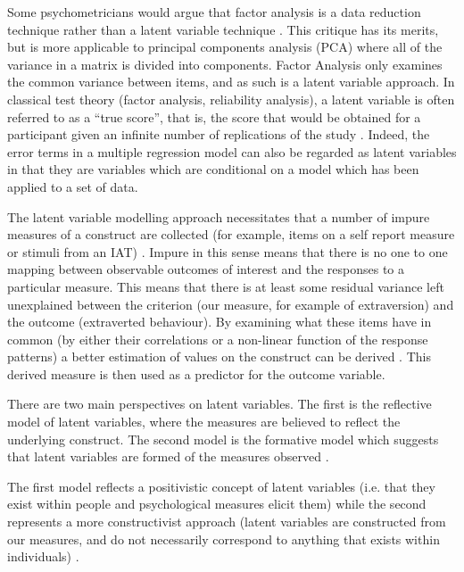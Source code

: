 Some psychometricians would argue that factor analysis is a data reduction technique rather than a latent variable technique \cite{borsboom2006attack}. This critique has its merits, but is more applicable to principal components analysis (PCA) where all of the variance in a matrix is divided into components. Factor Analysis only examines the common variance between items, and as such is a latent variable approach.  In classical test theory (factor analysis, reliability analysis), a latent variable is often referred to as a ``true score'', that is, the score that would be obtained for a participant given an infinite number of replications of the study \cite{bollen2002latent,edwards2000nature}. Indeed, the error terms in a multiple regression model can also be regarded as latent variables \cite{bollen2002latent} in that they are variables which are conditional on a model which has been applied to a set of data. 

 The latent variable modelling approach necessitates that a number of impure measures of a construct are collected (for example, items on a self report measure or stimuli from an IAT) \cite{edwards2000nature}. Impure in this sense means that there is no one to one mapping between observable outcomes of interest and the responses to a particular measure. This means that there is at least some residual variance left unexplained between the criterion (our measure, for example of extraversion) and the outcome (extraverted behaviour).  By examining what these items have in common (by either their correlations or a non-linear function of the response patterns) a better estimation of values on the  construct can be derived \cite{borsboom2006attack}. This derived measure is then used as a predictor for the outcome variable. 

There are two main perspectives on latent variables. The first is the reflective model of latent variables, where the measures are believed to reflect the underlying construct. The second model is the formative model which suggests that latent variables are formed of the measures observed \cite{bollen2002latent,edwards2000nature}.

The first model reflects a positivistic concept of latent variables (i.e. that they exist within people and psychological measures elicit them) while the second represents a more constructivist approach (latent variables are constructed from our measures, and do not necessarily correspond to anything that exists within individuals) \cite{borsboom2005measuring}.


